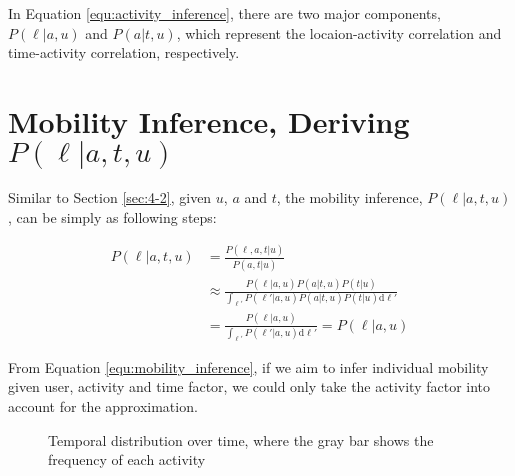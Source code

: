 In Equation \ref{equ:activity_inference}, there are two major components, $P(\ell | a, u)$ and $P(a | t, u)$, which represent the locaion-activity correlation and time-activity correlation, respectively.


\section{Mobility Inference, Deriving $P(\ell | a, t, u)$}
\label{sec:4-3}

Similar to Section \ref{sec:4-2}, given $u$, $a$ and $t$, the mobility inference, $P(\ell | a, t, u)$, can be simply as following steps:

\begin{align}
\label{equ:mobility_inference}
P(\ell | a, t, u) & = \frac{P(\ell , a, t| u)}{P( a, t| u)} \nonumber \\
& \approx \frac{P(\ell | a, u) P(a| t , u) P(t|u)}{\int_{\ell'} P(\ell' | a, u)P(a|t, u)P(t|u) \text{d} \ell'} \nonumber \\
& = \frac{P(\ell | a, u)}{\int_{\ell'} P(\ell' | a, u)\text{d}\ell'} =P(\ell | a, u) 
\end{align}

From Equation \ref{equ:mobility_inference}, if we aim to infer individual mobility given user, activity and time factor, we could only take the activity factor into account for the approximation.

\begin{figure*}[!ht]
\centering
{}
\caption{Temporal distribution over time, where the gray bar shows the frequency of each activity}
\label{fig:activity_time}
\end{figure*}

